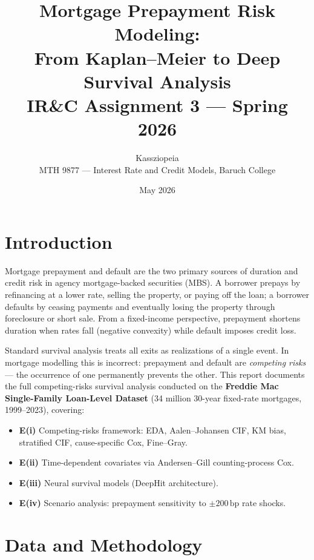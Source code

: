 \documentclass[11pt,a4paper]{article}
\title{\vspace{-1.5em}\textbf{Mortgage Prepayment Risk Modeling:\\
From Kaplan--Meier to Deep Survival Analysis}\\[0.3em]
\large IR\&C Assignment 3 --- Spring 2026}
\author{Kassziopeia\\\small MTH 9877 --- Interest Rate and Credit Models, Baruch College}
\date{May 2026}
\begin{document}
\maketitle
\vspace{-1.2em}

\section{Introduction}

Mortgage prepayment and default are the two primary sources of duration
and credit risk in agency mortgage-backed securities (MBS). A borrower
prepays by refinancing at a lower rate, selling the property, or paying
off the loan; a borrower defaults by ceasing payments and eventually
losing the property through foreclosure or short sale. From a fixed-income
perspective, prepayment shortens duration when rates fall (negative
convexity) while default imposes credit loss.

Standard survival analysis treats all exits as realizations of a single
event. In mortgage modelling this is incorrect: prepayment and default are
\emph{competing risks} --- the occurrence of one permanently prevents the
other. This report documents the full competing-risks survival analysis
conducted on the \textbf{Freddie Mac Single-Family Loan-Level Dataset}
(34 million 30-year fixed-rate mortgages, 1999--2023), covering:

\begin{itemize}[leftmargin=1.4em,itemsep=2pt]
  \item \textbf{E(i)} Competing-risks framework: EDA, Aalen--Johansen CIF,
        KM bias, stratified CIF, cause-specific Cox, Fine--Gray.
  \item \textbf{E(ii)} Time-dependent covariates via Andersen--Gill
        counting-process Cox.
  \item \textbf{E(iii)} Neural survival models (DeepHit architecture).
  \item \textbf{E(iv)} Scenario analysis: prepayment sensitivity to
        $\pm200\,\text{bp}$ rate shocks.
\end{itemize}

\section{Data and Methodology}
\end{document}
